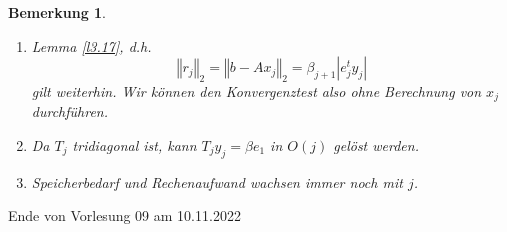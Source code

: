 \documentclass{book}
\newtheorem{remark}[algorithm]{Bemerkung}
\begin{document}
            \begin{remark}\label{b3.25}
                \begin{enumerate}
                    \item Lemma \ref{l3.17}, d.h. 
                    \[\left\Vert r_j \right\Vert_2=\left\Vert b-Ax_j \right\Vert_2=\beta_{j+1}\left\vert e_j^ty_j \right\vert\]
                    gilt weiterhin. Wir können den Konvergenztest also ohne Berechnung von $x_j$ durchführen.
                    \item Da $T_j$ tridiagonal ist, kann $T_jy_j=\beta e_1$ in $O(j)$ gelöst werden.
                    \item Speicherbedarf und Rechenaufwand wachsen immer noch mit $j$. 
                \end{enumerate}
            \end{remark}

            \noindent
            \xrfill[0.7ex]{1pt}Ende von Vorlesung 09 am 10.11.2022\xrfill[0.7ex]{1pt}
            
\end{document}
